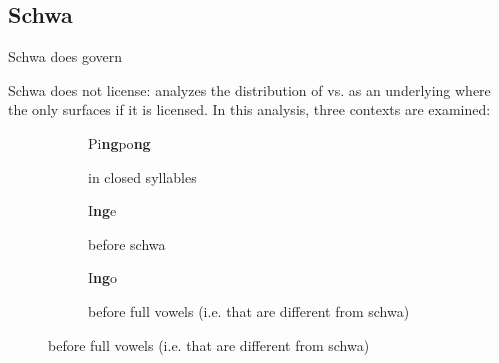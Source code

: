 \subsection[Schwa]{Schwa\footnotemark}
Schwa does govern

Schwa does not license: \cite{scheer2004} analyzes the distribution
of \textipa{[N]} vs. \textipa{[Ng]} as an underlying 
where the  only surfaces if it is licensed.
In this analysis, three contexts are examined:

\begin{figure}[h]
  \captionsetup[subfigure]{
    labelformat=simple,        %
    labelsep=period,           %
    justification=raggedright, %
    singlelinecheck=false,     %
    position=top,              %
  }
  \begin{subfigure}[T]{.5\textwidth}
    \caption{\ti{[N]} in closed syllables}
    \label{fig:ng:closed syllable}
    \begin{structure}{Pi\textbf{ng}po\textbf{ng} \ti{[pINpON]}}
      \Ng[nolic]
      \emptyV[gov]
      \Ng[nolic]
      \fen
    \end{structure}
  \end{subfigure}
  \hfill
  \begin{subfigure}[T]{.45\textwidth}
    \caption{\ti{[N]} before schwa}
    \label{fig:ng:before schwa}
    \begin{structure}{I\textbf{ng}e \ti{[PIN@]}}
      \Ng[nolic]
      \V{\textschwa}
    \end{structure}
  \end{subfigure}

  \vspace{1.5em}
  \begin{subfigure}[T]{\textwidth}
    \caption{\ti{[Ng]} before full vowels (i.e. that are different from schwa)}
    \label{fig:ng:before full vowel}
    \begin{structure}{I\textbf{ng}o \ti{[PINgo:]}}
      \Ng[lic]
    \end{structure}
  \end{subfigure}

\end{figure}

